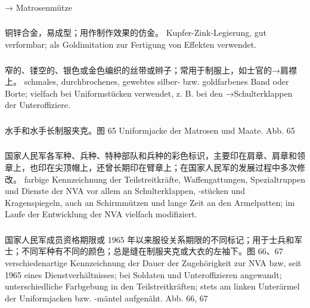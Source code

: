 \subsubsection*{}%

→ Matrosenmütze

\subsubsection*{}%

铜锌合金，易成型；用作制作效果的仿金。
Kupfer-Zink-Legierung, gut verformbar; als Goldimitation zur Fertigung von Effekten verwendet.

\subsubsection*{}%

窄的、镂空的、银色或金色编织的丝带或辫子；常用于制服上，如士官的→肩襟上。
schmales, durchbrochenes, gewebtes silber- bzw. goldfarbenes Band oder Borte; vielfach bei Uniformstücken verwendet, z. B. bei den →Schulterklappen der Unteroffiziere.

\subsubsection*{}%

水手和水手长制服夹克。图 65
Uniformjacke der Matrosen und Maate. Abb. 65

\subsubsection*{}%

国家人民军各军种、兵种、特种部队和兵种的彩色标识，主要印在肩章、肩章和领章上，也印在尖顶帽上，还曾长期印在臂章上；在国家人民军的发展过程中多次修改。
farbige Kennzeichnung der Teilstreitkräfte, Waffengattungen, Spezialtruppen und Dienste der NVA vor allem an Schulterklappen, -stücken und Kragenspiegeln, auch an Schirmmützen und lange Zeit an den Armelpatten; im Laufe der Entwicklung der NVA vielfach modifiziert.

\subsubsection*{}%

国家人民军成员资格期限或 1965 年以来服役关系期限的不同标记；用于士兵和军士；不同军种有不同的颜色；总是缝在制服夹克或大衣的左袖下。图 66、67
verschiedenartige Kennzeichnung der Dauer der Zugehörigkeit zur NVA bzw, seit 1965 eines Dienstverhältnisses; bei Soldaten und Unteroffizieren angewandt; unterschiedliche Farbgebung in den Teilstreitkräften; stets am linken Unterärmel der Uniformjacken bzw. -mäntel aufgenäht. Abb. 66, 67

